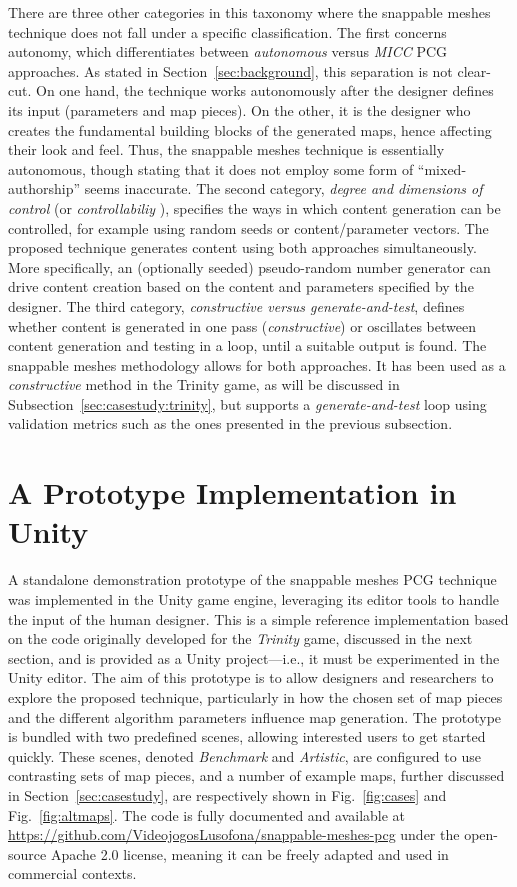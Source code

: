 \documentclass[journal]{IEEEtran}
\begin{document}
There are three other categories in this taxonomy where the snappable meshes technique
does not fall under a specific classification. The first concerns autonomy, which
differentiates between \textit{autonomous} versus \textit{MICC} PCG approaches. As
stated in Section~\ref{sec:background}, this separation is not clear-cut. On one hand,
the technique works autonomously after the designer defines its input (parameters and
map pieces).
On the other, it is the designer who creates the fundamental building blocks of the
generated maps, hence affecting their look and feel.
Thus, the snappable meshes technique is essentially autonomous,
though stating that it does not employ some form of ``mixed-authorship'' seems
inaccurate.
The second category, \textit{degree and dimensions of control} (or \textit{controllabiliy}
\cite{yannakakis2018artificial}), specifies the ways in which content generation can be
controlled, for example using random seeds or content/parameter vectors. The proposed
technique generates content using both approaches simultaneously. More specifically, an
(optionally seeded) pseudo-random number generator can drive content creation based on the
content and parameters specified by the designer.
The third category, \textit{constructive versus generate-and-test}, defines whether content is
generated in one pass (\textit{constructive}) or oscillates between content generation and
testing in a loop, until a suitable output is found. The snappable meshes methodology allows
for both approaches. It has been used as a \textit{constructive} method in the Trinity game,
as will be discussed in Subsection~\ref{sec:casestudy:trinity}, but supports a
\textit{generate-and-test} loop using validation metrics such as the ones presented in the
previous subsection.

\section{A Prototype Implementation in Unity}
\label{sec:impl}

A standalone demonstration prototype of the snappable meshes PCG technique was implemented in
the Unity game engine, leveraging its editor tools to handle the input of the human designer.
This is a simple reference implementation based on the code originally developed for the
\textit{Trinity} game, discussed in the next section, and is provided as a Unity project---i.e.,
it must be experimented in the Unity editor. The aim of this prototype is to allow designers
and researchers to explore the proposed technique, particularly in how the chosen set of map
pieces and the different algorithm parameters influence map generation. The prototype is
bundled with two predefined scenes, allowing interested users to get started quickly. These
scenes, denoted \textit{Benchmark} and \textit{Artistic}, are configured to use contrasting
sets of map pieces, and a number of example maps, further discussed in
Section~\ref{sec:casestudy}, are respectively shown in Fig.~\ref{fig:cases} and
Fig.~\ref{fig:altmaps}. The code is fully documented and available at
\url{https://github.com/VideojogosLusofona/snappable-meshes-pcg} under the open-source
Apache 2.0 license, meaning it can be freely adapted and used in commercial contexts.
\end{document}
